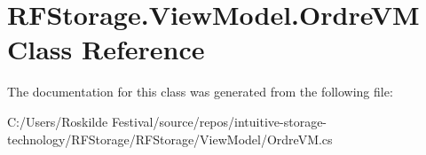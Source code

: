 \section{R\+F\+Storage.\+View\+Model.\+Ordre\+VM Class Reference}
\label{class_r_f_storage_1_1_view_model_1_1_ordre_v_m}


The documentation for this class was generated from the following file\+:\begin{DoxyCompactItemize}
\item 
C\+:/\+Users/\+Roskilde Festival/source/repos/intuitive-\/storage-\/technology/\+R\+F\+Storage/\+R\+F\+Storage/\+View\+Model/Ordre\+V\+M.\+cs\end{DoxyCompactItemize}
